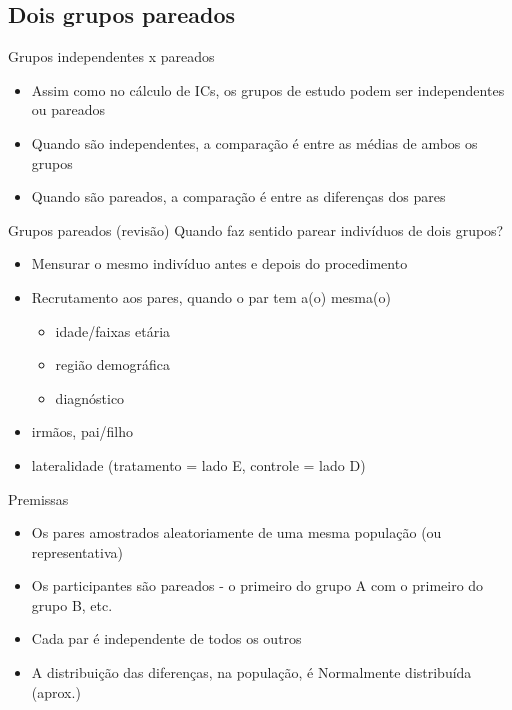 \documentclass{beamer}
\begin{document}
\subsection{Dois grupos pareados}

\begin{frame}{\scriptsize Grupos independentes x pareados}
  \begin{itemize}
    \footnotesize
  \item Assim como no cálculo de ICs, os grupos de estudo podem ser independentes ou pareados
  \item Quando são independentes, a comparação é entre as médias de ambos os grupos
  \item Quando são pareados, a comparação é entre as diferenças dos pares
  \end{itemize}
\end{frame}


\begin{frame}{\scriptsize Grupos pareados (revisão)}
Quando faz sentido parear indivíduos de dois grupos?
  \begin{itemize}
    \footnotesize
  \item Mensurar o \alert{mesmo} indivíduo antes e depois do procedimento
  \item Recrutamento aos pares, quando o par tem a(o) mesma(o)
    \begin{itemize}
    \footnotesize
    \item idade/faixas etária
    \item região demográfica
    \item diagnóstico
    \end{itemize}
  \item irmãos, pai/filho
  \item lateralidade (tratamento = lado E, controle = lado D)
  \end{itemize}
\end{frame}

\begin{frame}{\scriptsize Premissas}
  \begin{itemize}
    \footnotesize
  \item Os pares amostrados aleatoriamente de uma mesma população (ou representativa)
  \item Os participantes são pareados - o primeiro do grupo A com o primeiro do grupo B, etc.
  \item Cada par é independente de todos os outros
  \item A distribuição das diferenças, na população, é Normalmente distribuída (aprox.)
  \end{itemize}
\end{frame}
\end{document}
